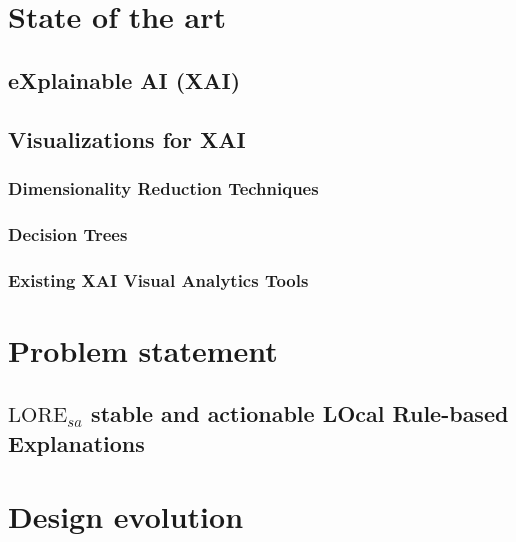 \chapter{State of the art}
    \section{eXplainable AI (XAI)}
        
    
    \section{Visualizations for XAI}\label{sec:Visualizations for XAI}
        
        \subsection{Dimensionality Reduction Techniques}
        
        \subsection{Decision Trees}
        
        \subsection{Existing XAI Visual Analytics Tools}
        
    
\chapter{Problem statement}
    
    
    \section{\texorpdfstring{$\text{LORE}_{sa}$}: stable and actionable LOcal Rule-based Explanations}\label{sec:lore_sa}
    
    
\chapter{Design evolution}\label{cap:design}
